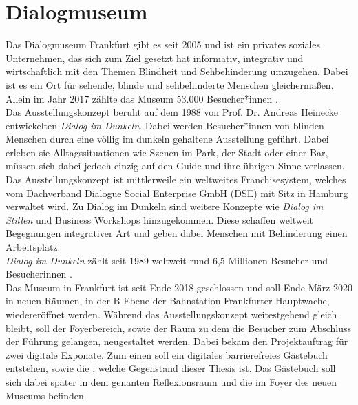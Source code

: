 \section{Dialogmuseum}
\label{section:dialogmuseum}

Das Dialogmuseum Frankfurt \cite{dialogmuseum} gibt es seit 2005 und ist ein privates soziales 
Unternehmen, das sich zum Ziel gesetzt hat informativ, integrativ und wirtschaftlich mit 
den Themen Blindheit und Sehbehinderung umzugehen. Dabei ist es ein Ort für sehende, 
blinde und sehbehinderte Menschen gleichermaßen. Allein im Jahr 2017 zählte das Museum 53.000 
Besucher*innen \cite{besucher}.\\

Das Ausstellungskonzept beruht auf dem 1988 von Prof. Dr. Andreas Heinecke entwickelten
\emph{Dialog im Dunkeln}. Dabei werden Besucher*innen von blinden Menschen durch eine 
völlig im dunkeln gehaltene Ausstellung geführt. Dabei erleben sie Alltagssituationen
wie Szenen im Park, der Stadt oder einer Bar, müssen sich dabei jedoch einzig auf
den Guide und ihre übrigen Sinne verlassen.\\

Das Ausstellungskonzept ist mittlerweile ein weltweites Franchisesystem, welches vom 
Dachverband Dialogue Social Enterprise GmbH (DSE) \cite{dachverband} mit Sitz in Hamburg verwaltet wird.
Zu Dialog im Dunkeln sind weitere Konzepte wie \emph{Dialog im Stillen} und Business Workshops
hinzugekommen. Diese schaffen weltweit Begegnungen integrativer Art und geben dabei 
Menschen mit Behinderung einen Arbeitsplatz.\\
\emph{Dialog im Dunkeln} zählt seit 1989 weltweit rund 6,5 Millionen Besucher und Besucherinnen
\cite{weltweit}.\\

Das Museum in Frankfurt ist seit Ende 2018 geschlossen und soll Ende März 2020 in neuen Räumen, in der B-Ebene
der Bahnstation Frankfurter Hauptwache, wiedereröffnet werden. Während das Ausstellungskonzept
weitestgehend gleich bleibt, soll der Foyerbereich, sowie der Raum zu dem die Besucher zum Abschluss
der Führung gelangen, neugestaltet werden. Dabei bekam \meso{} den Projektauftrag für zwei
digitale Exponate. Zum einen soll ein digitales barrierefreies Gästebuch entstehen, sowie die
\shst{}, welche Gegenstand dieser Thesis ist. Das Gästebuch soll sich dabei später in dem 
genanten Reflexionsraum und die \shst{} im Foyer des neuen Museums befinden.
